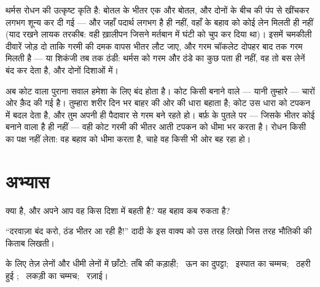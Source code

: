 \begin{example}[थर्मस]\label{ex:g5:heat-and-insulation:thermos}
थर्मस रोधन की उत्कृष्ट कृति है: बोतल के भीतर एक और बोतल, और दोनों के
बीच की  पंप से खींचकर लगभग शून्य कर दी गई --- और जहाँ पदार्थ लगभग
है ही नहीं, वहाँ  के बहाव को कोई लेन मिलती ही नहीं (याद रखने
लायक तरकीब: वही ख़ालीपन जिसने मर्तबान में घंटी को चुप कर दिया था)।
इसमें चमकीली दीवारें जोड़ दो ताकि गरमी की दमक वापस भीतर लौट जाए, और
गरम चॉकलेट दोपहर बाद तक गरम मिलती है --- या शिकंजी तब तक ठंडी: थर्मस
को गरम और ठंडे का कुछ पता ही नहीं, वह तो बस लेनें बंद कर देता है, और
दोनों दिशाओं में।
\end{example}

\begin{remark}\label{rem:g5:heat-and-insulation:coat}
अब कोट वाला पुराना सवाल हमेशा के लिए बंद होता है। कोट किसी 
बनाने वाले --- यानी तुम्हारे --- चारों ओर क़ैद की गई  है। तुम्हारा
शरीर दिन भर बाहर की ओर  की धारा बहाता है; कोट उस धारा को टपकन
में बदल देता है, और तुम अपनी ही पैदावार से गरम बने रहते हो। बर्फ़ के
पुतले पर --- जिसके भीतर कोई  बनाने वाला है ही नहीं --- वही कोट
गरमी की भीतर आती टपकन को धीमा भर करता है। रोधन किसी का पक्ष नहीं लेता:
वह बहाव को धीमा करता है, चाहे वह किसी भी ओर बह रहा हो।
\end{remark}

\section{अभ्यास}

\begin{exercise}[$\star$]\label{exo:g5:heat-and-insulation:1}
 क्या है, और अपने आप वह किस दिशा में बहती है? यह बहाव कब रुकता
है?
\end{exercise}

\begin{exercise}[$\star$]\label{exo:g5:heat-and-insulation:2}
``दरवाज़ा बंद करो, ठंड भीतर आ रही है!'' दादी के इस वाक्य को उस तरह
लिखो जिस तरह भौतिकी की किताब लिखती।
\end{exercise}

\begin{exercise}[$\star$]\label{exo:g5:heat-and-insulation:3}
 के लिए तेज़ लेनों और धीमी लेनों में छाँटो: ताँबे की कड़ाही; \
ऊन का दुपट्टा; \ इस्पात का चम्मच; \ ठहरी हुई ; \ लकड़ी का चम्मच;
\ रज़ाई।
\end{exercise}


